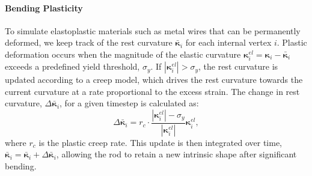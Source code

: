  \paragraph{Bending Plasticity}
 To simulate elastoplastic materials such as metal wires that can be permanently deformed, we keep track of the rest curvature $\bar{\boldsymbol{\kappa}}_i$ for each internal vertex $i$. 
Plastic deformation occurs when the magnitude of the elastic curvature $\boldsymbol{\kappa}^{el}_i=\boldsymbol{\kappa}_i - \bar{\boldsymbol{\kappa}}_i$ exceeds a predefined yield threshold, $\sigma_y$. If $|\boldsymbol{\kappa}_i^{el}| > \sigma_y$, the rest curvature is updated according to a creep model, which drives the rest curvature towards the current curvature at a rate proportional to the excess strain. The change in rest curvature, $\Delta\bar{\boldsymbol{\kappa}}_i$, for a given timestep is calculated as: 
\begin{equation} 
\Delta\bar{\boldsymbol{\kappa}}_i = r_c \cdot \frac{|\boldsymbol{\kappa}_i^{el}| - \sigma_y}{|\boldsymbol{\kappa}_i^{el}|} \boldsymbol{\kappa}_i^{el},
\end{equation} 
where $r_c$ is the plastic creep rate. This update is then integrated over time, $\bar{\boldsymbol{\kappa}}_i =\bar{\boldsymbol{\kappa}}_i + \Delta\bar{\boldsymbol{\kappa}}_i$, allowing the rod to retain a new intrinsic shape after significant bending.

